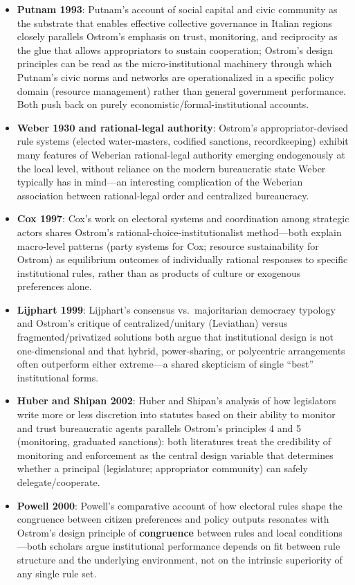 \documentclass[12pt]{article}
\begin{document}
\begin{itemize}[leftmargin=*, itemsep=4pt]
    \item \textbf{Putnam 1993}: Putnam's account of social capital and civic community as the substrate that enables effective collective governance in Italian regions closely parallels Ostrom's emphasis on trust, monitoring, and reciprocity as the glue that allows appropriators to sustain cooperation; Ostrom's design principles can be read as the micro-institutional machinery through which Putnam's civic norms and networks are operationalized in a specific policy domain (resource management) rather than general government performance. Both push back on purely economistic/formal-institutional accounts.
    \item \textbf{Weber 1930 and rational-legal authority}: Ostrom's appropriator-devised rule systems (elected water-masters, codified sanctions, recordkeeping) exhibit many features of Weberian rational-legal authority emerging endogenously at the local level, without reliance on the modern bureaucratic state Weber typically has in mind---an interesting complication of the Weberian association between rational-legal order and centralized bureaucracy.
    \item \textbf{Cox 1997}: Cox's work on electoral systems and coordination among strategic actors shares Ostrom's rational-choice-institutionalist method---both explain macro-level patterns (party systems for Cox; resource sustainability for Ostrom) as equilibrium outcomes of individually rational responses to specific institutional rules, rather than as products of culture or exogenous preferences alone.
    \item \textbf{Lijphart 1999}: Lijphart's consensus vs.\ majoritarian democracy typology and Ostrom's critique of centralized/unitary (Leviathan) versus fragmented/privatized solutions both argue that institutional design is not one-dimensional and that hybrid, power-sharing, or polycentric arrangements often outperform either extreme---a shared skepticism of single ``best'' institutional forms.
    \item \textbf{Huber and Shipan 2002}: Huber and Shipan's analysis of how legislators write more or less discretion into statutes based on their ability to monitor and trust bureaucratic agents parallels Ostrom's principles 4 and 5 (monitoring, graduated sanctions): both literatures treat the credibility of monitoring and enforcement as the central design variable that determines whether a principal (legislature; appropriator community) can safely delegate/cooperate.
    \item \textbf{Powell 2000}: Powell's comparative account of how electoral rules shape the congruence between citizen preferences and policy outputs resonates with Ostrom's design principle of \textbf{congruence} between rules and local conditions---both scholars argue institutional performance depends on fit between rule structure and the underlying environment, not on the intrinsic superiority of any single rule set.

\end{itemize}
\end{document}
